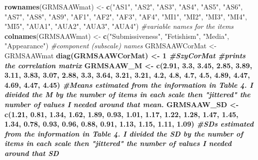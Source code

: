 \documentclass[
  english,
]{book}
\newenvironment{Shaded}{\begin{snugshade}}{\end{snugshade}}
\newcommand{\CommentTok}[1]{\textcolor[rgb]{0.56,0.35,0.01}{\textit{#1}}}
\newcommand{\DecValTok}[1]{\textcolor[rgb]{0.00,0.00,0.81}{#1}}
\newcommand{\FloatTok}[1]{\textcolor[rgb]{0.00,0.00,0.81}{#1}}
\newcommand{\KeywordTok}[1]{\textcolor[rgb]{0.13,0.29,0.53}{\textbf{#1}}}
\newcommand{\NormalTok}[1]{#1}
\newcommand{\OperatorTok}[1]{\textcolor[rgb]{0.81,0.36,0.00}{\textbf{#1}}}
\newcommand{\StringTok}[1]{\textcolor[rgb]{0.31,0.60,0.02}{#1}}
\begin{document}
\begin{Shaded}
\begin{Highlighting}[]
\KeywordTok{rownames}\NormalTok{(GRMSAAWmat) <-}\StringTok{ }\KeywordTok{c}\NormalTok{(}\StringTok{"AS1"}\NormalTok{, }\StringTok{"AS2"}\NormalTok{, }\StringTok{"AS3"}\NormalTok{, }\StringTok{"AS4"}\NormalTok{, }\StringTok{"AS5"}\NormalTok{, }\StringTok{"AS6"}\NormalTok{, }\StringTok{"AS7"}\NormalTok{, }\StringTok{"AS8"}\NormalTok{, }\StringTok{"AS9"}\NormalTok{, }\StringTok{"AF1"}\NormalTok{, }\StringTok{"AF2"}\NormalTok{, }\StringTok{"AF3"}\NormalTok{, }\StringTok{"AF4"}\NormalTok{, }\StringTok{"MI1"}\NormalTok{, }\StringTok{"MI2"}\NormalTok{, }\StringTok{"MI3"}\NormalTok{, }\StringTok{"MI4"}\NormalTok{, }\StringTok{"MI5"}\NormalTok{, }\StringTok{"AUA1"}\NormalTok{, }\StringTok{"AUA2"}\NormalTok{, }\StringTok{"AUA3"}\NormalTok{, }\StringTok{"AUA4"}\NormalTok{) }\CommentTok{#variable names for the items}
\KeywordTok{colnames}\NormalTok{(GRMSAAWmat) <-}\StringTok{ }\KeywordTok{c}\NormalTok{(}\StringTok{"Submissiveness"}\NormalTok{, }\StringTok{"Fetishism"}\NormalTok{, }\StringTok{"Media"}\NormalTok{, }\StringTok{"Appearance"}\NormalTok{) }\CommentTok{#component (subscale) names}
\NormalTok{GRMSAAWCorMat <-}\StringTok{ }\NormalTok{GRMSAAWmat }\OperatorTok{%
\KeywordTok{diag}\NormalTok{(GRMSAAWCorMat) <-}\StringTok{ }\DecValTok{1}
\CommentTok{#SzyCorMat #prints the correlation matrix}
\NormalTok{GRMSAAW_M <-}\StringTok{ }\KeywordTok{c}\NormalTok{(}\FloatTok{2.91}\NormalTok{,    }\FloatTok{3.3}\NormalTok{,    }\FloatTok{3.45}\NormalTok{,   }\FloatTok{2.85}\NormalTok{,   }\FloatTok{3.89}\NormalTok{,   }\FloatTok{3.11}\NormalTok{,   }\FloatTok{3.83}\NormalTok{,   }\FloatTok{3.07}\NormalTok{,   }\FloatTok{2.88}\NormalTok{, }\FloatTok{3.3}\NormalTok{, }\FloatTok{3.64}\NormalTok{,    }\FloatTok{3.21}\NormalTok{,   }\FloatTok{3.21}\NormalTok{, }\FloatTok{4.2}\NormalTok{,  }\FloatTok{4.8}\NormalTok{,    }\FloatTok{4.7}\NormalTok{,    }\FloatTok{4.5}\NormalTok{,    }\FloatTok{4.89}\NormalTok{, }\FloatTok{4.47}\NormalTok{, }\FloatTok{4.69}\NormalTok{,   }\FloatTok{4.47}\NormalTok{,   }\FloatTok{4.45}\NormalTok{) }\CommentTok{#Means estimated from the information in Table 4. I divided the M by the number of items in each scale then "jittered" the number of values I needed around that mean.}
\NormalTok{GRMSAAW_SD <-}\StringTok{ }\KeywordTok{c}\NormalTok{(}\FloatTok{1.21}\NormalTok{,   }\FloatTok{0.81}\NormalTok{,   }\FloatTok{1.34}\NormalTok{,   }\FloatTok{1.62}\NormalTok{,   }\FloatTok{1.89}\NormalTok{,   }\FloatTok{0.93}\NormalTok{,   }\FloatTok{1.01}\NormalTok{,   }\FloatTok{1.17}\NormalTok{,   }\FloatTok{1.22}\NormalTok{, }\FloatTok{1.28}\NormalTok{, }\FloatTok{1.47}\NormalTok{,   }\FloatTok{1.45}\NormalTok{,   }\FloatTok{1.34}\NormalTok{, }\FloatTok{0.78}\NormalTok{, }\FloatTok{0.93}\NormalTok{,   }\FloatTok{0.96}\NormalTok{,   }\FloatTok{0.88}\NormalTok{,   }\FloatTok{0.91}\NormalTok{, }\FloatTok{1.13}\NormalTok{, }\FloatTok{1.15}\NormalTok{,   }\FloatTok{1.11}\NormalTok{,   }\FloatTok{1.09}\NormalTok{) }\CommentTok{#SDs estimated from the information in Table 4. I divided the SD by the number of items in each scale then "jittered" the number of values I needed around that SD}
}
\end{Highlighting}
\end{Shaded}
\end{document}
